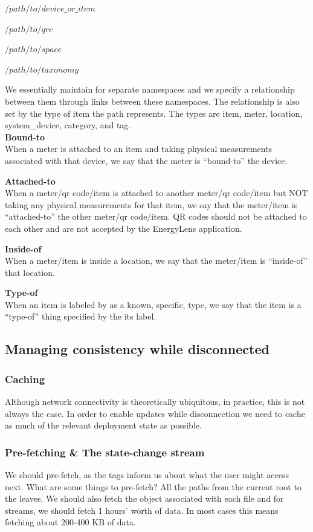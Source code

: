 $/path/to/device\_or\_item$

$/path/to/qrc$

$/path/to/space$

$/path/to/taxonomy$

We essentially maintain for separate namespaces and we specify a relationship between them through links between these namespaces.  The relationship is also set by the type of item the path represents.  The types are item, meter, location, system\_device, category, and tag.\\

{\bf Bound-to}\\
When a meter is attached to an item and taking physical measurements associated with that device, we say that the meter is “bound-to” the device.

{\bf Attached-to}\\
When a meter/qr code/item is attached to another meter/qr code/item but NOT taking any physical measurements for that item, we say that the meter/item is “attached-to” the other meter/qr code/item.  QR codes should not be attached to each other and are not accepted by the EnergyLens application.

{\bf Inside-of}\\
When a meter/item is inside a location, we say that the meter/item is “inside-of” that location.

{\bf Type-of}\\
When an item is labeled by as a known, specific, type, we say that the item is a “type-of” thing specified by the its label.

\subsection{Managing consistency while disconnected}

\subsubsection{Caching}
Although network connectivity is theoretically ubiquitous, in practice, this is not always the case.  In order to enable updates while disconnection we need to cache as much of the relevant deployment state as possible.

\subsubsection{Pre-fetching \& The state-change stream}
We should pre-fetch, as the tags inform us about what the user might access next.  What are some things to pre-fetch?  All the paths from the current root to the leaves.  We should also fetch the object associated with each file and for streams, we should fetch 1 hours’ worth of data.  In most cases this means fetching about 200-400 KB of data.

